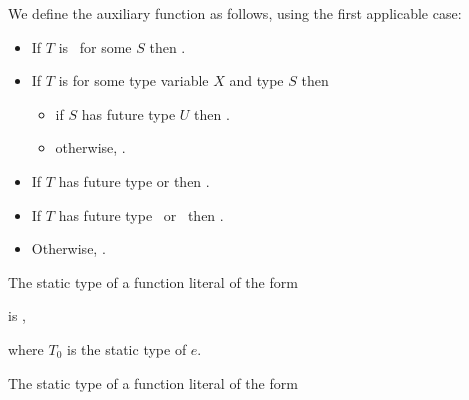\documentclass[makeidx]{article}
\begin{document}
{\LMHash{}%
We define the auxiliary function
as follows, using the first applicable case:

\begin{itemize}
\item If $T$ is \ for some $S$
  then .

\item If $T$ is 
  for some type variable $X$ and type $S$ then
  \begin{itemize}
  \item if $S$ has future type $U$
    then .
  \item otherwise,
    .
  \end{itemize}

\item If $T$ has future type 
  or 
  then .

\item If $T$ has future type \ or
  \ then .

\item Otherwise, .
\end{itemize}


\LMHash{}%
The static type of a function literal of the form

\noindent
\code{<\TypeParametersStd>}

\noindent
{}

\noindent
is
,

\noindent
where $T_0$ is the static type of $e$.
\EndCase

\LMHash{}%
The static type of a function literal of the form

\noindent
\code{<\TypeParametersStd>}

\noindent
{}

}
\end{document}
